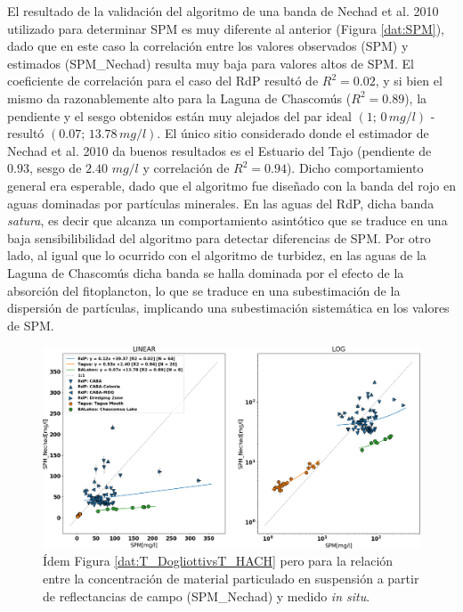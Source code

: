         El resultado de la validación del algoritmo de una banda de Nechad et al. 2010 utilizado para determinar SPM es muy diferente al anterior (Figura \ref{dat:SPM}), dado que en este caso la correlación entre los valores observados (SPM) y estimados (SPM\_Nechad) resulta muy baja para valores altos de SPM. El coeficiente de correlación para el caso del RdP resultó de $R^{2}=0.02$, y si bien el mismo da razonablemente alto para la Laguna de Chascomús ($R^{2}=0.89$), la pendiente y el sesgo obtenidos están muy alejados del par ideal $(1;\,0\,mg/l)$ - resultó $(0.07;\,13.78\,mg/l)$. El único sitio considerado donde el estimador de Nechad et al. 2010 da buenos resultados es el Estuario del Tajo (pendiente de $0.93$, sesgo de $2.40$ $mg/l$ y correlación de $R^{2}=0.94$). Dicho comportamiento general era esperable, dado que el algoritmo fue diseñado con la banda del rojo en aguas dominadas por partículas minerales. En las aguas del RdP, dicha banda \textit{satura}, es decir que alcanza un comportamiento asintótico que se traduce en una baja sensibilibilidad del algoritmo para detectar diferencias de SPM. Por otro lado, al igual que lo ocurrido con el algoritmo de turbidez, en las aguas de la Laguna de Chascomús dicha banda se halla dominada por el efecto de la absorción del fitoplancton, lo que se traduce en una subestimación de la dispersión de partículas, implicando una subestimación sistemática en los valores de SPM.

        \begin{figure}
        \centering
        \includegraphics[width=\textwidth]{dat/figures/ScatterSPM_NechadvsSPM.png}
        \caption[Relación entre la concentración de material particulado en suspensión a partir de reflectancias de campo (SPM\_Nechad) y medido \textit{in situ}.]{Ídem Figura \ref{dat:T_DogliottivsT_HACH} pero para la relación entre la concentración de material particulado en suspensión a partir de reflectancias de campo (SPM\_Nechad) y medido \textit{in situ}.}
        \label{dat:SPM_NechadvsSPM}
        \end{figure}
        
